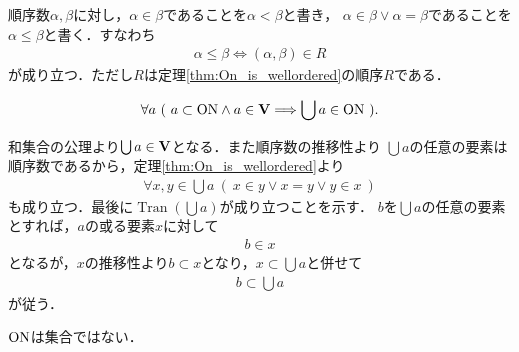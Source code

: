 	順序数$\alpha,\beta$に対し，$\alpha \in \beta$であることを$\alpha < \beta$と書き，
	$\alpha \in \beta \vee \alpha = \beta$であることを$\alpha \leq \beta$と書く．すなわち
	\begin{align}
		\alpha \leq \beta \Longleftrightarrow (\alpha,\beta) \in R
	\end{align}
	が成り立つ．ただし$R$は定理\ref{thm:On_is_wellordered}の順序$R$である．
	
	\begin{screen}
		\begin{thm}
			\begin{align}
				\forall a\ 
				(\ a \subset \ON \wedge a \in \Univ \Longrightarrow \bigcup a \in \ON\ ).
			\end{align}
		\end{thm}
	\end{screen}
	
	\begin{prf}
		和集合の公理より$\bigcup a \in \mathbf{V}$となる．また順序数の推移性より
		$\bigcup a$の任意の要素は順序数であるから，定理\ref{thm:On_is_wellordered}より
		\begin{align}
			\forall x,y \in \bigcup a\ (\ x \in y \vee x = y \vee y \in x\ )
		\end{align}
		も成り立つ．最後に$\operatorname{Tran}(\bigcup a)$が成り立つことを示す．
		$b$を$\bigcup a$の任意の要素とすれば，$a$の或る要素$x$に対して
		\begin{align}
			b \in x
		\end{align}
		となるが，$x$の推移性より$b \subset x$となり，$x \subset \bigcup a$と併せて
		\begin{align}
			b \subset \bigcup a
		\end{align}
		が従う．
		\QED
	\end{prf}
	
	\begin{screen}
		\begin{thm}
			$\mathrm{ON}$は集合ではない．
		\end{thm}
	\end{screen}
	

